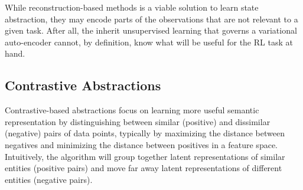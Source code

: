 

While reconstruction-based methods is a viable solution to learn state abstraction, they may encode parts of the observations that are not relevant to a given task. After all, the inherit unsupervised learning that governs a variational auto-encoder cannot, by definition, know what will be useful for the RL task at hand. 


\subsection{Contrastive Abstractions}

Contrastive-based abstractions focus on learning more useful semantic representation by distinguishing between similar (positive) and dissimilar (negative) pairs of data points, typically by maximizing the distance between negatives and minimizing the distance between positives in a feature space. Intuitively, the algorithm will group together latent representations of similar entities (positive pairs) and move far away latent representations of different entities (negative pairs).

